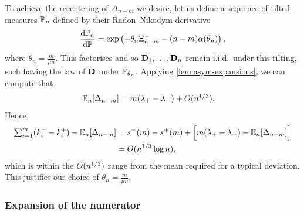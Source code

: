 To achieve the recentering of $\Delta_{n-m}$ we desire, let us define a sequence of tilted measures $\P_n$ defined by their Radon--Nikodym derivative
\begin{equation}
    \diff{\P_n}{\P} = \exp \left( - \theta_n \Xi^-_{n-m} - (n - m) \alpha(\theta_n) \right),
\end{equation}
where $\theta_n = \frac{m}{\mu n}$. This factorises and so $\vD_1, \ldots, \vD_n$ remain i.i.d.\ under this tilting, each having the law of $\vD$ under $\P_{\theta_n}$. Applying \cref{lem:asym-expansions}, we can compute that
\begin{align*}
    \E_n[\Delta_{n-m}] 
    &= m(\lambda_+ - \lambda_-) + \bigo(n^{1/3}).
\end{align*}
Hence,
\begin{align*}
    \textstyle \sum_{i=1}^m (k_i^- - k_i^+) - \E_n[\Delta_{n-m}] 
    &= s^-(m) - s^+(m) + \Big[ m(\lambda_+ - \lambda_-) - \E_n[\Delta_{n-m}] \Big] \\
    &= \bigo(n^{1/3} \log n),
\end{align*}
which is within the $\bigo(n^{1/2})$ range from the mean required for a typical deviation. This justifies our choice of $\theta_n = \frac{m}{\mu n}$. 

\subsubsection{Expansion of the numerator}

